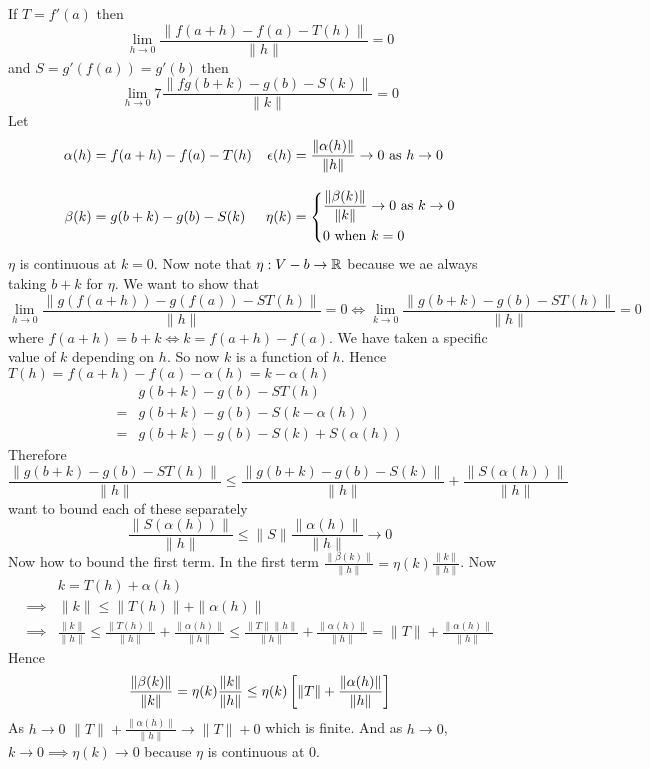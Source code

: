 \begin{myproof}
	If $T=f'(a)$ then $$\lim_{h\to 0}\frac{\|f(a+h)-f(a)-T(h)\|}{\|h\|}=0$$and $S=g'(f(a))=g'(b)$ then $$ \lim_{h\to 0}7\frac{\|fg(b+k)-g(b)-S(k)\|}{\|k\|}=0$$Let \begin{align*}
		\alpha(h) & = f(a+h)-f(a)-T(h) & \eps(h) & = \frac{\|\alpha(h)\|}{\|h\|}\to 0\text{ as }h\to 0  \\[3mm]
		\beta(k)  & = g(b+k)-g(b)-S(k) & \eta(k) & = \begin{cases*}
			                                             \dfrac{\|\beta(k)\|}{\|k\|}\to0  \text{ as }k\to 0 \\
			                                             0      \text{ when }                         k=0
		                                             \end{cases*}
	\end{align*}
	$\eta$ is continuous at $k=0$. Now note that $\eta:V-b\to \mathbb{R}$ because we ae always taking $b+k$ for $\eta$. We want to show that \[\lim_{h\to 0}\frac{\|g(f(a+h))-g(f(a))-ST(h)\|}{\|h\|}=0\iff \lim_{k\to 0}\frac{\|g(b+k)-g(b)-ST(h)\|}{\|h\|}=0\]where $f(a+h)=b+k\iff k=f(a+h)-f(a)$. We have taken a specific value of $k$ depending on $h$. So now $k$ is a function of $h$. Hence $T(h)=f(a+h)-f(a)-\alpha(h)=k-\alpha(h)$
	\begin{align*}
		  & g(b+k) -g(b) -ST(h)           \\
		= & g(b+k) -g(b) -S(k-\alpha(h))  \\
		= & g(b+k)-g(b)-S(k)+S(\alpha(h))
	\end{align*}Therefore\[ \frac{\|g(b+k)-g(b)-ST(h)\|}{\|h\|}\leq \frac{\|g(b+k)-g(b)-S(k)\|}{\|h\|}+\frac{\|S(\alpha(h))\|}{\|h\|}\] want to bound each of these separately
	\[\frac{\|S(\alpha(h))\|}{\|h\|}\leq \|S\|\frac{\|\alpha(h)\|}{\|h\|}\to 0\]Now how to bound the first term. In the first term $\frac{\|\beta(k)\|}{\|h\|}=\eta(k)\frac{\|k\|}{\|h\|}$. Now \begin{align*}
		         & k=T(h)+\alpha(h)                                                                                                                                                        \\
		\implies & \|k\|\leq \|T(h)\|+\|\alpha(h)\|                                                                                                                                        \\
		\implies & \frac{\|k\|}{\|h\|}\leq \frac{\|T(h)\|}{\|h\|}+\frac{\|\alpha(h)\|}{\|h\|}\leq \frac{\|T\|\|h\|}{\|h\|}+\frac{\|\alpha(h)\|}{\|h\|} = \|T\|+\frac{\|\alpha(h)\|}{\|h\|}
	\end{align*}Hence $$\frac{\|\beta(k)\|}{\|k\|}=\eta(k)\frac{\|k\|}{\|h\|}\leq \eta(k)\left[\|T\|+\frac{\|\alpha(h)\|}{\|h\|}\right]$$As $h\to 0$ $\|T\|+\frac{\|\alpha(h)\|}{\|h\|}\to \|T\|+0$ which is finite. And as $h\to 0$, $k\to 0\implies \eta(k)\to 0$ because $\eta$ is continuous at 0.
\end{myproof}

